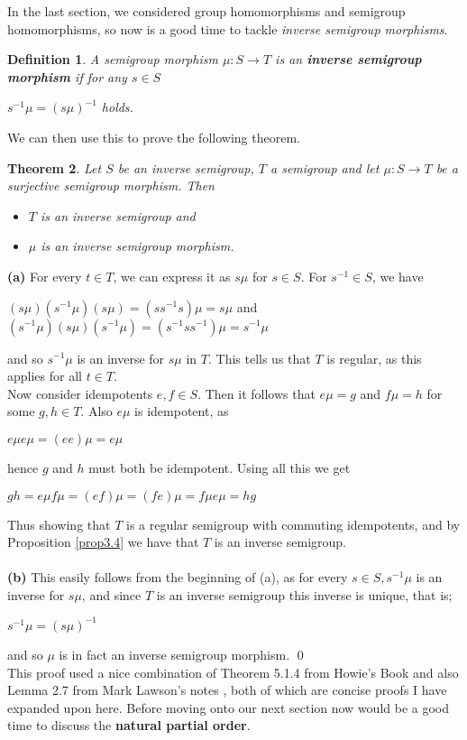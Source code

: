 \documentclass[12pt]{article}
\newtheorem{theorem}{Theorem}[subsection]
\newtheorem{defn}[theorem]{Definition}
\begin{document}
\noindent In the last section, we considered group homomorphisms and semigroup homomorphisms, so now is a good time to tackle \textit{inverse semigroup morphisms}.
\begin{defn}
	A semigroup morphism $\mu:S\to T$ is an \textbf{inverse semigroup morphism} if for any $s \in S$
	\begin{center}
		$s^{-1}\mu=(s\mu)^{-1}$ holds.
	\end{center}
\end{defn}
\noindent We can then use this to prove the following theorem.
\begin{theorem}\label{thm3.7}
	Let $S$ be an inverse semigroup, $T$ a semigroup and let $\mu:S \to T$ be a surjective semigroup morphism. Then 
	\begin{itemize}
			\item[\textbf{(a)}]$T$ is an inverse semigroup and 
			\item[\textbf{(b)}]$\mu$ is an inverse semigroup morphism.
	\end{itemize}
\end{theorem}
\proof
	\textbf{(a)} For every $t \in T$, we can express it as $s\mu$ for $s \in S$. For $s^{-1} \in S$, we have
	\begin{center}
		$(s\mu)(s^{-1}\mu)(s\mu)=(ss^{-1}s)\mu=s\mu$ \quad and\\
		$(s^{-1}\mu)(s\mu)(s^{-1}\mu)=(s^{-1}ss^{-1})\mu=s^{-1}\mu$
	\end{center}
	and so $s^{-1}\mu$ is an inverse for $s\mu$ in $T$. This tells us that $T$ is regular, as this applies for all $t \in T$.\\
	Now consider idempotents $e,f \in S$. Then it follows that $e\mu=g$ and $f\mu=h$ for some $g,h \in T$. Also $e\mu$ is idempotent, as
	\begin{center}
		$e\mu e\mu = (ee)\mu=e\mu$
	\end{center}
	hence $g$ and $h$ must both be idempotent. Using all this we get
	\begin{center}
		$gh=e\mu f\mu=(ef)\mu=(fe)\mu=f\mu e\mu=hg$
	\end{center}
	Thus showing that $T$ is a regular semigroup with commuting idempotents, and by Proposition \ref{prop3.4} we have that $T$ is an inverse semigroup. \\
	\\\textbf{(b)} This easily follows from the beginning of (a), as for every $s \in S, s^{-1}\mu$ is an inverse for $s\mu$, and since $T$ is an inverse semigroup this inverse is unique, that is;
	\begin{center}
		$s^{-1}\mu = (s\mu)^{-1}$
	\end{center}
	and so $\mu$ is in fact an inverse semigroup morphism.
	\qed\\
This proof used a nice combination of Theorem 5.1.4 from Howie's Book \cite{3} and also Lemma 2.7 from Mark Lawson's notes \cite{4}, both of which are concise proofs I have expanded upon here. Before moving onto our next section now would be a good time to discuss the \textbf{natural partial order}.\\
\end{document}
